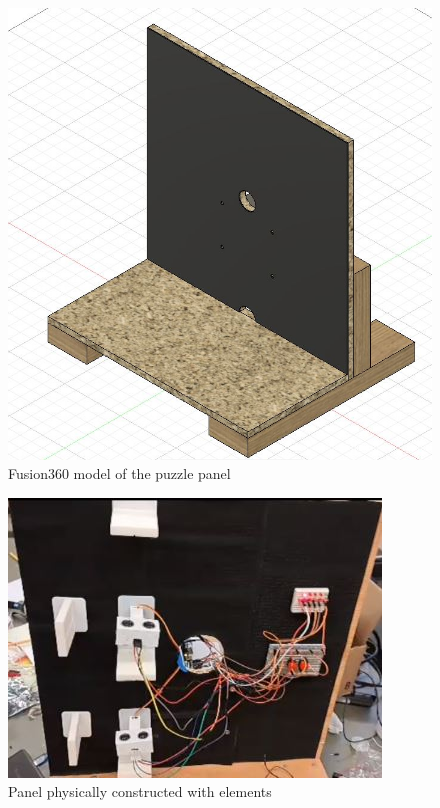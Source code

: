 \documentclass[a4paper, 10pt]{article}
\begin{document}
		\begin{figure} [h]
			\centering
			\includegraphics[scale=0.4]{Photos/puzzle_panel}
			\caption{Fusion360 model of the puzzle panel}
			\label{puzzle_panel_model}
		\end{figure}
		
		\begin{figure} [h]
			\centering
			\includegraphics[scale=1]{Photos/puzzle_panel_real}
			\caption{Panel physically constructed with elements}
			\label{puzzle_panel_real}
		\end{figure}
		
\end{document}
